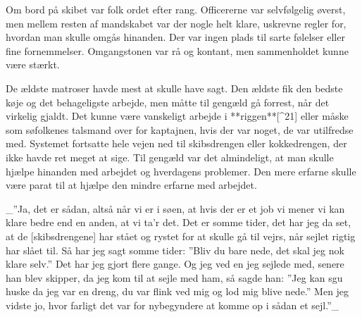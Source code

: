 \documentclass{book}
\begin{document}

Om bord på skibet var folk ordet efter rang. Officererne var selvfølgelig øverst,
men mellem resten af mandskabet var der nogle helt klare, uskrevne regler for, hvordan man
skulle omgås hinanden. Der var ingen plads til sarte følelser eller fine fornemmelser.
Omgangstonen var rå og kontant, men sammenholdet kunne være stærkt.

De ældste matroser havde mest at skulle have sagt. Den ældste fik den bedste køje og det
behageligste arbejde, men måtte til gengæld gå forrest, når det virkelig gjaldt. Det kunne
være vanskeligt arbejde i **riggen**[^21] eller måske som søfolkenes talsmand over for kaptajnen,
hvis der var noget, de var utilfredse med. Systemet fortsatte hele vejen ned til
skibsdrengen eller kokkedrengen, der ikke havde ret meget at sige. Til gengæld var det
almindeligt, at man skulle hjælpe hinanden med arbejdet og hverdagens problemer. Den mere
erfarne skulle være parat til at hjælpe den mindre erfarne med arbejdet.



 _”Ja, det er sådan, altså når vi er i søen, at hvis der er et job vi mener vi kan klare
bedre end en anden, at vi ta'r det. Det er somme tider, det har jeg da set, at de
[skibsdrengene] har stået og rystet for at skulle gå til vejrs, når sejlet rigtig har
slået til. Så har jeg sagt somme tider: ”Bliv du bare nede, det skal jeg nok klare selv.”
Det har jeg gjort flere gange. Og jeg ved en jeg sejlede med, senere han blev skipper, da
jeg kom til at sejle med ham, så sagde han: ”Jeg kan sgu huske da jeg var en dreng, du var
flink ved mig og lod mig blive nede.” Men jeg vidste jo, hvor farligt det var for
nybegyndere at komme op i sådan et sejl.”_
\end{document}

